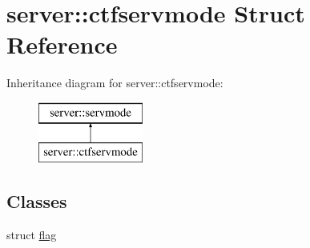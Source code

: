 \hypertarget{structserver_1_1ctfservmode}{}\section{server\+:\+:ctfservmode Struct Reference}
\label{structserver_1_1ctfservmode}
Inheritance diagram for server\+:\+:ctfservmode\+:\begin{figure}[H]
\begin{center}
\leavevmode
\includegraphics[height=2.000000cm]{structserver_1_1ctfservmode}
\end{center}
\end{figure}
\subsection*{Classes}
\begin{DoxyCompactItemize}
\item 
struct \hyperlink{structserver_1_1ctfservmode_1_1flag}{flag}
\end{DoxyCompactItemize}
